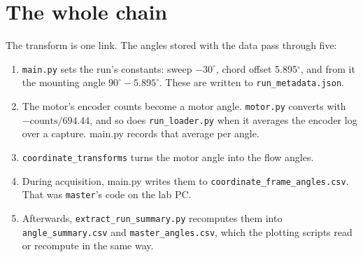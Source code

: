 \documentclass[11pt]{article}
\newcommand{\code}[1]{\texttt{#1}}
\begin{document}
\section{The whole chain}
\label{sec:chain}

The transform is one link. The angles stored with the data pass through
five:
\begin{enumerate}
  \item \code{main.py} sets the run's constants: sweep $-30^\circ$, chord
        offset 5.895$^\circ$, and from it the mounting angle
        $90^\circ - 5.895^\circ$. These are written to
        \code{run\_metadata.json}.
  \item The motor's encoder counts become a motor angle. \code{motor.py}
        converts with $-\text{counts}/694.44$, and so does
        \code{run\_loader.py} when it averages the encoder log over a
        capture. main.py records that average per angle.
  \item \code{coordinate\_transforms} turns the motor angle into the flow
        angles.
  \item During acquisition, main.py writes them to
        \code{coordinate\_frame\_angles.csv}. That was \code{master}'s
        code on the lab PC.
  \item Afterwards, \code{extract\_run\_summary.py} recomputes them into
        \code{angle\_summary.csv} and \code{master\_angles.csv}, which the
        plotting scripts read or recompute in the same way.
\end{enumerate}
\end{document}
